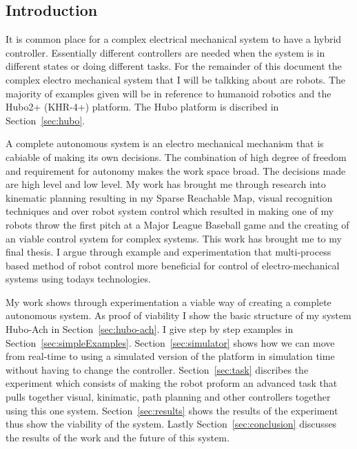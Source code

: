\subsection{Introduction}



It is common place for a complex electrical mechanical system to have a hybrid controller.  
Essentially different controllers are needed when the system is in different states or doing different tasks.
For the remainder of this document the complex electro mechanical system that I will be talkking about are robots.
The majority of examples given will be in reference to humanoid robotics and the Hubo2+ (KHR-4+) platform.
The Hubo platform is discribed in Section~\ref{sec:hubo}.

A complete autonomous system is an electro mechanical mechanism that is cabiable of making its own decisions.
The combination of high degree of freedom and requirement for autonomy makes the work space broad.
The decisions made are high level and low level.
My work has brought me through research into kinematic planning resulting in my Sparse Reachable Map, visual recognition techniques and over robot system control which resulted in making one of my robots throw the first pitch at a Major League Baseball game and the creating of an viable control system for complex systems.
This work has brought me to my final thesis.
I argue through example and experimentation that multi-process based method of robot control more beneficial for control of electro-mechanical systems using todays technologies.


My work shows through experimentation a viable way of creating a complete autonomous system.  
As proof of viability I show the basic structure of my system Hubo-Ach in Section~\ref{sec:hubo-ach}\cite{lofaroRAM2013}.  
I give step by step examples in Section~\ref{sec:simpleExamples}.
Section~\ref{sec:simulator} shows how we can move from real-time to using a simulated version of the platform in simulation time without having to change the controller.
Section~\ref{sec:task} discribes the experiment which consists of making the robot proform an advanced task that pulls together visual, kinimatic, path planning and other controllers together using this one system.
Section~\ref{sec:results} shows the results of the experiment thus show the viability of the system.
Lastly Section~\ref{sec:conclusion} discusses the results of the work and the future of this system.






